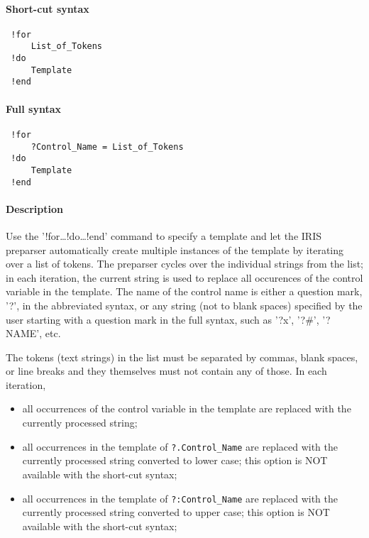 


	\paragraph{Short-cut syntax}
 
 \begin{verbatim}
 !for
     List_of_Tokens
 !do
     Template
 !end
 \end{verbatim}
 
 \paragraph{Full syntax}
 
 \begin{verbatim}
 !for
     ?Control_Name = List_of_Tokens
 !do
     Template
 !end
 \end{verbatim}
 
 \paragraph{Description}
 
 Use the '!for\ldots{}!do\ldots{}!end' command to specify a template and
 let the IRIS preparser automatically create multiple instances of the
 template by iterating over a list of tokens. The preparser cycles over
 the individual strings from the list; in each iteration, the current
 string is used to replace all occurences of the control variable in the
 template. The name of the control name is either a question mark, '?',
 in the abbreviated syntax, or any string (not to blank spaces) specified
 by the user starting with a question mark in the full syntax, such as
 '?x', '?\#', '?NAME', etc.
 
 The tokens (text strings) in the list must be separated by commas, blank
 spaces, or line breaks and they themselves must not contain any of
 those. In each iteration,
 
 \begin{itemize}
 \item
   all occurrences of the control variable in the template are replaced
   with the currently processed string;
 \item
   all occurrences in the template of \texttt{?.Control\_Name} are
   replaced with the currently processed string converted to lower case;
   this option is NOT available with the short-cut syntax;
 \item
   all occurrences in the template of \texttt{?:Control\_Name} are
   replaced with the currently processed string converted to upper case;
   this option is NOT available with the short-cut syntax;
 \end{itemize}
 
